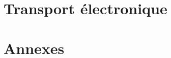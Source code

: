 \documentclass[a4paper,justified,twoside,nobib]{tufte-book}
\renewcommand{\=}[1]{\stackrel{#1}{=}} %
\begin{document}
    \part[TRANSPORT ÉLECTRONIQUE]{Transport électronique}
%
    
    
    
    
    
%
%
%    
%    
%
%
    \part[ANNEXES]{Annexes}
%
    
    


\backmatter

%
%


\printindex
\end{document}
